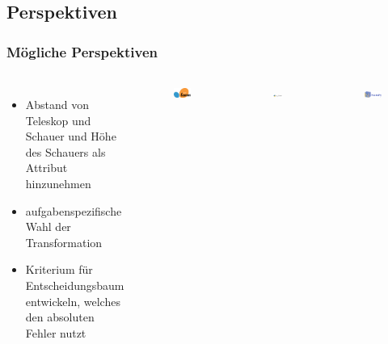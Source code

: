 \documentclass[aspectratio=1610, professionalfonts, 9pt]{beamer}
\begin{document}
  \subsection{Perspektiven}

  \begin{frame}
    \frametitle{Mögliche Perspektiven}
    \begin{columns}
      \begin{itemize}
        \item Abstand von Teleskop und Schauer und Höhe des Schauers als Attribut hinzunehmen
        \item aufgabenspezifische Wahl der Transformation
        \item Kriterium für Entscheidungsbaum entwickeln, welches den absoluten Fehler nutzt
      \end{itemize}
      \begin{figure}
        \includegraphics[width=\textwidth]{pictures/sklearn.png}
      \end{figure}
      \begin{figure}
        \includegraphics[width=\textwidth]{pictures/python.png}
      \end{figure}
      \begin{figure}
        \includegraphics[width=\textwidth]{pictures/numpy.png}
      \end{figure}


\end{columns}
\end{frame}
\end{document}
